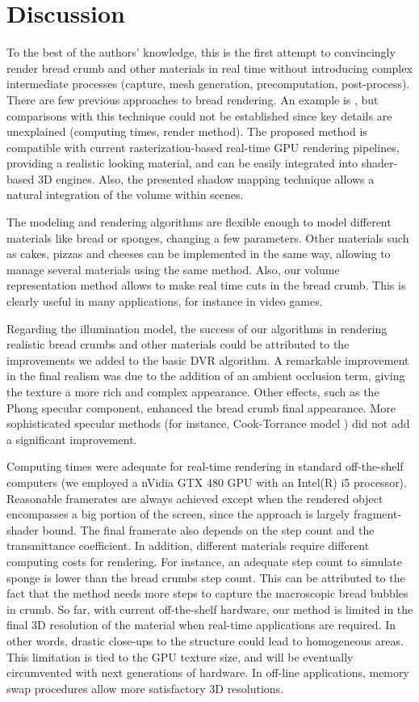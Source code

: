 \section{Discussion}

To the best of the authors' knowledge, this is the first attempt to convincingly render bread crumb and other materials in real time without introducing complex intermediate processes (capture, mesh generation, precomputation, post-process).
There are few previous approaches to bread rendering. An example is \cite{Cho2007}, but comparisons with this technique could not be established since key details are unexplained (computing times, render method).
The proposed method is compatible with current rasterization-based real-time GPU rendering pipelines, providing a realistic looking material, and can be easily integrated into  shader-based 3D engines.
Also, the presented shadow mapping technique allows a natural integration of the volume within scenes. 

The modeling and rendering algorithms are flexible enough to model different materials like bread or sponges, changing a few parameters.
Other materials such as cakes, pizzas and cheeses can be implemented in the same way, allowing to manage several materials using the same method.
Also, our volume representation method allows to make real time cuts in the bread crumb.
This is clearly useful in many applications, for instance in video games.

Regarding the illumination model, the success of our algorithms in rendering realistic bread crumbs and other materials could be attributed to the improvements we added to the basic DVR algorithm.
A remarkable improvement in the final realism was due to the addition of an ambient occlusion term, giving the texture a more rich and complex appearance.
Other effects, such as the Phong specular component, enhanced the bread crumb final appearance.
More sophisticated specular methods (for instance, Cook-Torrance model \cite{Cook1982}) did not add a significant improvement.

Computing times were adequate for real-time rendering in standard off-the-shelf computers (we employed a nVidia GTX 480 GPU with an Intel(R) i5 processor).
Reasonable framerates are always achieved except when the rendered object encompasses a big portion of the screen, since the approach is largely fragment-shader bound.
The final framerate also depends on the step count and the transmittance coefficient.
In addition, different materials require different computing costs for rendering.
For instance, an adequate step count to simulate sponge is lower than the bread crumbs step count.
This can be attributed to the fact that the method needs more steps to capture the macroscopic bread bubbles in crumb.
So far, with current off-the-shelf hardware, our method is limited in the final 3D resolution of the material when real-time applications are required.
In other words, drastic close-ups to the structure could lead to homogeneous areas.
This limitation is tied to the GPU texture size, and will be eventually circumvented with next generations of hardware.
In off-line applications, memory swap procedures allow more satisfactory 3D resolutions.


